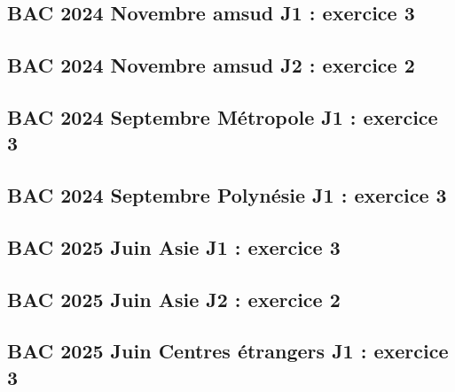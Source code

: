 \documentclass[lang=fr,edition=teacher,layout=sheet]{mxbook}
\begin{document}
\begingroup\endgroup
\par\bigskip
{}\subsection*{BAC 2024 Novembre amsud J1 : exercice 3}
\begingroup\endgroup
\par\bigskip
{}\subsection*{BAC 2024 Novembre amsud J2 : exercice 2}
\begingroup\endgroup
\par\bigskip
{}\subsection*{BAC 2024 Septembre Métropole J1 : exercice 3}
\begingroup\endgroup
\par\bigskip
{}\subsection*{BAC 2024 Septembre Polynésie J1 : exercice 3}
\begingroup\endgroup
\par\bigskip
{}\subsection*{BAC 2025 Juin Asie J1 : exercice 3}
\begingroup\endgroup
\par\bigskip
{}\subsection*{BAC 2025 Juin Asie J2 : exercice 2}
\begingroup\endgroup
\par\bigskip
{}\subsection*{BAC 2025 Juin Centres étrangers J1 : exercice 3}
\end{document}
